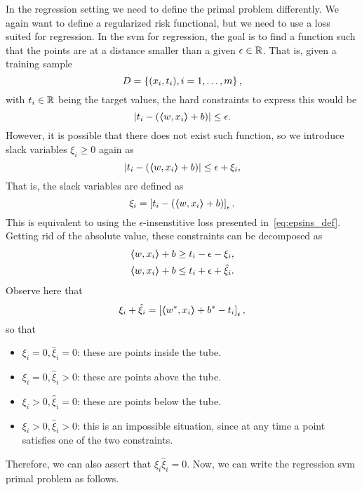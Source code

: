 In the regression setting we need to define the primal problem differently. We again want to define a regularized risk functional, but we need to use a loss suited for regression. In the \acrshort{svm} for regression, the goal is to find a function such that the points are at a distance smaller than a given $\epsilon \in \mathbb{R}$. 
%
That is, given a training sample 
$$ D = \left\{(x_i, t_i), i=1, \ldots, m\right\}, $$
with $t_i \in \mathbb{R}$ being the target values, the hard constraints to express this would be 
\begin{equation}
    \nonumber
    \left|t_i - (\bm{\left\langle} w, x_i \bm{\right\rangle} + b) \right| \leq \epsilon.
\end{equation}
However, it is possible that there does not exist such function, so we introduce slack variables $\xi_i \geq 0$ again as
\begin{equation}
    \nonumber
    \left|t_i - (\bm{\left\langle} w, x_i \bm{\right\rangle} + b) \right| \leq \epsilon + \xi_i,
\end{equation}
That is, the slack variables are defined as 
\begin{equation}
    \xi_i = \left[t_i - (\bm{\left\langle} w, x_i \bm{\right\rangle} + b)\right]_{\epsilon} .
\end{equation}
This is equivalent to using the $\epsilon$-insenstitive loss presented in~\eqref{eq:epsins_def}.
Getting rid of the absolute value, these constraints can be decomposed as
\begin{equation}
    \nonumber
    \begin{aligned}
        \bm{\left\langle} w, x_i \bm{\right\rangle} + b &\geq t_i - \epsilon - \xi_i , \\
        \bm{\left\langle} w, x_i \bm{\right\rangle} + b &\leq t_i + \epsilon + \hat{\xi}_i.
    \end{aligned}
\end{equation}
Observe here that $$ \xi_i + \hat{\xi}_i = \left[\bm{\left\langle} {w}^*, x_i \bm{\right\rangle} + {b}^* - t_i\right]_{\epsilon} ,$$
so that
\begin{itemize}
    \item $\xi_i = 0, \hat{\xi}_i = 0$: these are points inside the tube.
    \item $\xi_i = 0, \hat{\xi}_i > 0$: these are points above the tube.
    \item $\xi_i > 0, \hat{\xi}_i = 0$: these are points below the tube.
    \item $\xi_i > 0, \hat{\xi}_i > 0$: this is an impossible situation, since at any time a point satisfies one of the two constraints.
\end{itemize}
Therefore, we can also assert that $\xi_i \hat{\xi}_i = 0$.
%
Now, we can write the regression \acrshort{svm} primal problem as follows.
